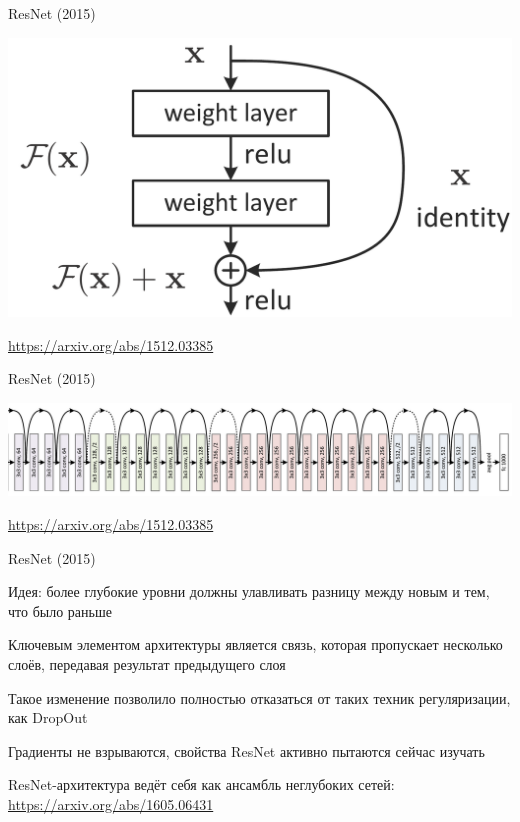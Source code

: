 \documentclass[notes,12pt, aspectratio=169]{beamer}
\newenvironment{wideitemize}{\itemize\addtolength{\itemsep}{10pt}}{\enditemize}
\begin{document}
\begin{frame}{ResNet (2015)}
\begin{center}
	\includegraphics[scale=0.2]{resnet_layer.png}
\end{center}
\vfill %
\footnotesize
\color{blue} \url{https://arxiv.org/abs/1512.03385}
\end{frame}


\begin{frame}{ResNet (2015)}
\begin{center}
	\includegraphics[width=0.8\paperwidth]{resnet.png}
\end{center}
\vfill %
\footnotesize
\color{blue} \url{https://arxiv.org/abs/1512.03385}
\end{frame}


\begin{frame}{ResNet (2015)}
\begin{wideitemize}
\item \alert{Идея:} более глубокие уровни должны улавливать разницу между новым и тем, что было раньше 

\item Ключевым элементом архитектуры является связь, которая пропускает несколько слоёв, передавая результат предыдущего слоя

\item Такое изменение позволило полностью отказаться от таких техник регуляризации, как DropOut

\item Градиенты не взрываются, свойства ResNet активно пытаются сейчас изучать

\item  ResNet-архитектура ведёт себя как ансамбль неглубоких сетей:  \color{blue} \url{https://arxiv.org/abs/1605.06431}
\end{wideitemize}
\end{frame}
\end{document}
